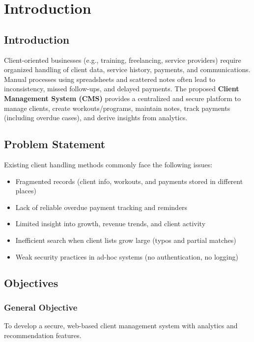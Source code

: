 \documentclass[12pt,a4paper]{report}
\begin{document}
\clearpage
{}

\chapter{Introduction}
\section{Introduction}
Client-oriented businesses (e.g., training, freelancing, service providers) require organized handling of client data, service history, payments, and communications. Manual processes using spreadsheets and scattered notes often lead to inconsistency, missed follow-ups, and delayed payments. The proposed \textbf{Client Management System (CMS)} provides a centralized and secure platform to manage clients, create workouts/programs, maintain notes, track payments (including overdue cases), and derive insights from analytics.

\section{Problem Statement}
Existing client handling methods commonly face the following issues:
\begin{itemize}[leftmargin=*]
  \item Fragmented records (client info, workouts, and payments stored in different places)
  \item Lack of reliable overdue payment tracking and reminders
  \item Limited insight into growth, revenue trends, and client activity
  \item Inefficient search when client lists grow large (typos and partial matches)
  \item Weak security practices in ad-hoc systems (no authentication, no logging)
\end{itemize}

\section{Objectives}
\subsection*{General Objective}
To develop a secure, web-based client management system with analytics and recommendation features.
\end{document}
